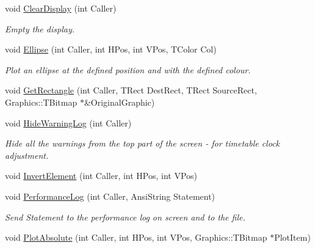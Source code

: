 \begin{DoxyCompactItemize}
\mbox{\label{class_t_display_a8d990507ae0111e0b7890e8aa77fd76d}} 
void \mbox{\hyperlink{class_t_display_a8d990507ae0111e0b7890e8aa77fd76d}{Clear\+Display}} (int Caller)
\begin{DoxyCompactList}\small\item\em Empty the display. \end{DoxyCompactList}\item 
\mbox{\label{class_t_display_ac97de4f74b0b295de941320578d6da28}} 
void \mbox{\hyperlink{class_t_display_ac97de4f74b0b295de941320578d6da28}{Ellipse}} (int Caller, int H\+Pos, int V\+Pos, T\+Color Col)
\begin{DoxyCompactList}\small\item\em Plot an ellipse at the defined position and with the defined colour. \end{DoxyCompactList}\item 
void \mbox{\hyperlink{class_t_display_a2b408bc588565f7b0cdcb85edc7479b7}{Get\+Rectangle}} (int Caller, T\+Rect Dest\+Rect, T\+Rect Source\+Rect, Graphics\+::\+T\+Bitmap $\ast$\&Original\+Graphic)
\item 
\mbox{\label{class_t_display_ab77f8f220d8c0f3fbdcc96a616b969e6}} 
void \mbox{\hyperlink{class_t_display_ab77f8f220d8c0f3fbdcc96a616b969e6}{Hide\+Warning\+Log}} (int Caller)
\begin{DoxyCompactList}\small\item\em Hide all the warnings from the top part of the screen -\/ for timetable clock adjustment. \end{DoxyCompactList}\item 
void \mbox{\hyperlink{class_t_display_a63930b93b9883463cd9d779e86fefba2}{Invert\+Element}} (int Caller, int H\+Pos, int V\+Pos)
\item 
\mbox{\label{class_t_display_a92bea1eb27a17c6c7f902858d4115d71}} 
void \mbox{\hyperlink{class_t_display_a92bea1eb27a17c6c7f902858d4115d71}{Performance\+Log}} (int Caller, Ansi\+String Statement)
\begin{DoxyCompactList}\small\item\em Send Statement to the performance log on screen and to the file. \end{DoxyCompactList}\item 
void \mbox{\hyperlink{class_t_display_a7dae1c6470743a7cb778a6f813c7f0cc}{Plot\+Absolute}} (int Caller, int H\+Pos, int V\+Pos, Graphics\+::\+T\+Bitmap $\ast$Plot\+Item)

\end{DoxyCompactItemize}
